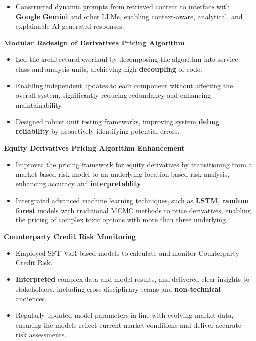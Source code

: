 \begin{cventries}
{\begin{cvitems}
\begin{itemize}
      \item Constructed dynamic prompts from retrieved content to interface with \textbf{Google Gemini} and other LLMs, enabling context-aware, analytical, and explainable AI-generated responses.
    \end{itemize}
    \item \textbf{Modular Redesign of Derivatives Pricing Algorithm}
    \begin{itemize}
      \item Led the architectural overhaul by decomposing the algorithm into service class and analysis units, archieving high \textbf{decoupling} of code.
      \item Enabling independent updates to each component without affecting the overall system, significantly reducing redundancy and enhancing maintainability.
      \item Designed robust unit testing frameworks, improving system \textbf{debug reliability} by proactively identifying potential errors.
    \end{itemize}
    \item \textbf{Equity Derivatives Pricing Algorithm Enhancement}
    \begin{itemize}
      \item Improved the pricing framework for equity derivatives by transitioning from a market-based risk model to an underlying location-based risk analysis, enhancing accuracy and \textbf{interpretablity}.
      \item Intergrated advanced machine learning techniques, such as \textbf{LSTM}, \textbf{random forest} models with traditional MCMC methods to price derivatives, enabling the pricing of complex toxic options with more than three underlying.
    \end{itemize}
    \item \textbf{Counterparty Credit Risk Monitoring}
    \begin{itemize}
      \item Employed SFT VaR-based models to calculate and monitor Counterparty Credit Risk.
      \item \textbf{Interpreted} complex data and model results, and delivered clear insights to stakeholders, including cross-disciplinary teams and \textbf{non-technical} audiences.
      \item Regularly updated model parameters in line with evolving market data, ensuring the models reflect current market conditions and deliver accurate risk assessments.
    \end{itemize}
  \end{cvitems}
}



\end{cventries}
